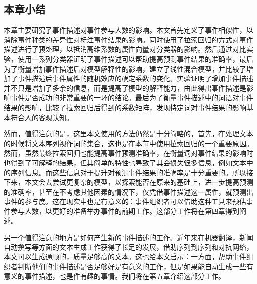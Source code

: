 \subsection{本章小结}
本章主要研究了事件描述对事件参与人数的影响。本文首先定义了事件相似性，以消除事件种类的差异性对标注事件结果的影响。同时使用了拉索回归的方式对事件描述进行了预处理，以抵消高维系数的属性向量对分类器的影响。然后通过对比实验，使用一系列分类器证明了事件描述可以帮助提高预测事件结果的准确率，最后为了衡量增加事件描述后对模型解释性的影响，建立了线性混合模型，并比较了增加了事件描述后事件属性的随机效应的确定系数的变化。实验证明了增加事件描述并不只是增加了多余的信息，而是提高了模型的解释能力，由此得出事件描述是影响事件是否成功的非常重要的一环的结论。最后为了衡量事件描述中的词语对事件结果的影响，比较了拉索回归后得到的系数矩阵，发现特定词对事件结果的影响基本符合人的客观认知。

然而，值得注意的是，这里本文使用的方法仍然是十分简略的，首先，在处理文本的时候将文本序列视作词的集合，这也是在本节中使用拉索回归的一个重要原因。然而，虽然最终拉索回归也能提高事件预测准确率，在衡量词对事件结果的影响时也得到了可解释的结果，但其简单的特性也导致了其会损失很多信息，例如文本中的序列信息。而这些信息对于提升对预测事件结果的准确率是十分重要的。所以接下来，本文会去尝试更复杂的模型，以探索能否在原来的基础上，进一步提高预测的准确率，甚至在不考虑其他因素的情况下，仅凭借事件描述这一属性，就预测出事件的参与度。这在现实中也是有意义的：事件组织者可以借助这种工具来预估事件参与人数，以更好的准备举办事件的前期工作。这部分工作将在第四章得到阐述。

另一个值得注意的地方是如何产生新的事件描述的工作。近年来在机器翻译，新闻自动撰写等方面的文本生成工作获得了长足的发展，借助序列到序列和对抗网络，本文可以生成通顺的，质量足够高的文本。这也给本文启示：一方面，帮助事件组织者判断他们的事件描述是否足够好是有意义的工作，但是如果能自动生成一些有意义的事件描述，也是件有趣的事情。我们将在第五章介绍这部分工作。

% 